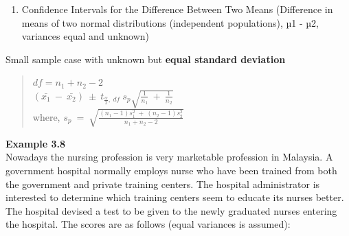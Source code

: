 \documentclass[
  a4paper,
  DIV=11,
  numbers=noendperiod,
  oneside]{scrreprt}
\providecommand{\tightlist}{%
  \setlength{\itemsep}{0pt}\setlength{\parskip}{0pt}}\usepackage{longtable,booktabs,array}
\begin{document}
\begin{tcolorbox}[enhanced jigsaw, arc=.35mm, bottomtitle=1mm, coltitle=black, colbacktitle=quarto-callout-note-color!10!white, rightrule=.15mm, colframe=quarto-callout-note-color-frame, toptitle=1mm, opacityback=0, colback=white, breakable, titlerule=0mm, title=\textcolor{quarto-callout-note-color}{\faInfo}\hspace{0.5em}{Note}, opacitybacktitle=0.6, leftrule=.75mm, bottomrule=.15mm, toprule=.15mm, left=2mm]

\begin{enumerate}
\def\labelenumi{(\alph{enumi})}
\tightlist
\item
  Confidence Intervals for the Difference Between Two Means (Difference
  in means of two normal distributions (independent populations), µ1 -
  µ2, variances equal and unknown)\\
\end{enumerate}

Small sample case with unknown but \textbf{equal standard deviation}\\

\begin{quote}
\(df=n_1 + n_2 -2\)\\
\((\bar{x_1}\ -\ \bar{x_2})\ \pm\ t_{\frac{\alpha}{2},\ df}\ s_p\sqrt{\frac{1}{n_1}\ +\ \frac{1}{n_2}}\)\\
where,
\(s_p\ =\ \sqrt{\frac{(n_1-1)s_1^2\ +\ (n_2-1)s_2^2}{n_1+n_2-2}}\)\\
\end{quote}

{\textbf{Example 3.8}}\\

Nowadays the nursing profession is very marketable profession in
Malaysia. A government hospital normally employs nurse who have been
trained from both the government and private training centers. The
hospital administrator is interested to determine which training centers
seem to educate its nurses better. The hospital devised a test to be
given to the newly graduated nurses entering the hospital. The scores
are as follows (equal variances is assumed):\\


\end{tcolorbox}
\end{document}
